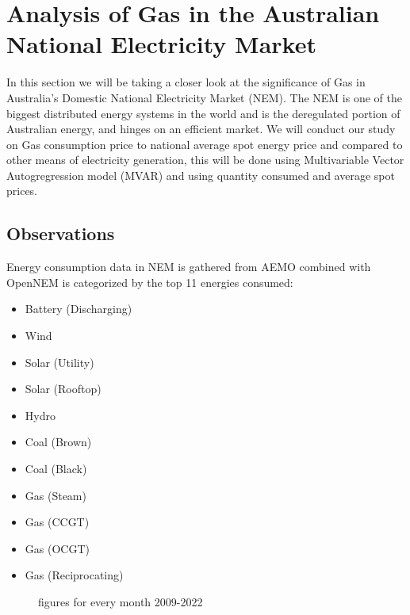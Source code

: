 \section{Analysis of Gas in the Australian National Electricity Market}

In this section we will be taking a closer look at the significance of Gas in Australia’s Domestic National Electricity Market (NEM). The NEM is one of the biggest distributed energy systems in the world and is the deregulated portion of Australian energy, and hinges on an efficient market. We will conduct our study on Gas consumption price to national average spot energy price and compared to other means of electricity generation, this will be done using Multivariable Vector Autogregression model (MVAR) and using quantity consumed and average spot prices.

\subsection{Observations}

Energy consumption data in NEM is gathered from AEMO \cite{NEM1} combined with OpenNEM \cite{NEM2} is categorized by the top 11 energies consumed:

\begin{multicols}{4}
\begin{itemize}
    \item Battery (Discharging)
    \item Wind
    \item Solar (Utility)
    \item Solar (Rooftop)
    \item Hydro
    \item Coal (Brown)
    \item Coal (Black)
    \item Gas (Steam)
    \item Gas (CCGT)
    \item Gas (OCGT)
    \item Gas (Reciprocating)
\end{itemize}
\end{multicols}

\begin{figure}[H]
    \centering
    \qquad
    \caption{figures for every month 2009-2022}%
    \label{fig:NEM-consump-price}%
\end{figure}

